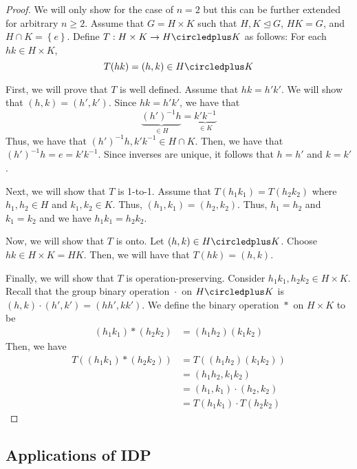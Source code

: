 \begin{proof}
    We will only show for the case of \(n=2\) but this can be further extended for arbitrary \(n \geq 2\). Assume that \(G = H \times K\) such that \(H, K \unlhd G\), \(HK = G\), and \(H \cap K = \left\{e\right\}\). Define \(T : H \times K \to H \circledplus K\) as follows: For each \(hk \in H \times K\),
    \[
        T(hk) = (h, k) \in H \circledplus K
    \]

    First, we will prove that \(T\) is well defined. Assume that \(hk = h'k'\). We will show that \((h, k) = (h', k')\). Since \(hk = h'k'\), we have that
    \[
        \underbrace{(h')^{-1}h}_{\in H} = \underbrace{k'k^{-1}}_{\in K}
    \]
    Thus, we have that \((h')^{-1}h, k'k^{-1} \in H \cap K\). Then, we have that \((h')^{-1}h = e = k'k^{-1}\). Since inverses are unique, it follows that \(h=h'\) and \(k=k'\).

    Next, we will show that \(T\) is 1-to-1. Assume that \(T(h_1 k_1) = T(h_2 k_2)\) where \(h_1, h_2 \in H\) and \(k_1, k_2 \in K\). Thus, \((h_1, k_1) = (h_2, k_2)\). Thus, \(h_1 = h_2\) and \(k_1 = k_2\) and we have \(h_1 k_1 = h_2 k_2\).

    Now, we will show that \(T\) is onto. Let \((h, k) \in H \circledplus K\). Choose \(hk \in H \times K = HK\). Then, we will have that \(T(hk) = (h, k)\).

    Finally, we will show that \(T\) is operation-preserving. Consider \(h_1 k_1, h_2 k_2 \in H \times K\). Recall that the group binary operation \({}\cdot{}\) on \(H \circledplus K\) is \((h, k) \cdot (h', k') = (hh', kk')\). We define the binary operation \({}*{}\) on \(H \times K\) to be
    \[
    \begin{aligned}
        (h_1 k_1) * (h_2 k_2) &= (h_1 h_2) (k_1 k_2)
    \end{aligned}
    \]
    Then, we have
    \[
    \begin{aligned}
        T((h_1 k_1) * (h_2 k_2)) &= T((h_1 h_2)(k_1 k_2)) \\
                                 &= (h_1 h_2, k_1 k_2) \\
                                 &= (h_1, k_1) \cdot (h_2, k_2) \\
                                 &= T(h_1 k_1) \cdot T(h_2 k_2)
    \end{aligned}
    \]
\end{proof}

\subsection{Applications of IDP}

